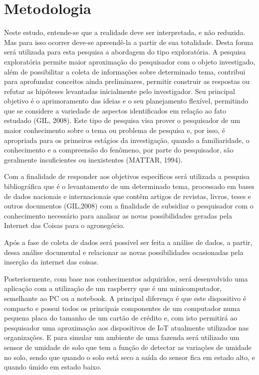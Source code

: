 \documentclass[eso]{bcc}
\begin{document}
\chapter{Metodologia}\label{chap:metodologia}
Neste estudo, entende-se que a realidade deve ser interpretada, e não reduzida. Mas para isso 
ocorrer deve-se apreendê-la a partir de sua totalidade. Desta forma será utilizada para esta 
pesquisa a abordagem do tipo exploratória. A pesquisa exploratória permite maior aproximação 
do pesquisador com o objeto investigado, além de possibilitar a coleta de informações sobre 
determinado tema, contribui para aprofundar conceitos ainda preliminares, permitir construir 
as respostas ou refutar as hipóteses levantadas inicialmente pelo investigador. Seu principal 
objetivo é o aprimoramento das ideias e o seu planejamento flexível, permitindo que se considere 
a variedade de aspectos identificados em relação ao fato estudado (GIL, 2008). 
Este tipo de pesquisa visa prover o pesquisador de um maior conhecimento sobre o tema ou 
problema de pesquisa e, por isso, é apropriada para os primeiros estágios da investigação, 
quando a familiaridade, o conhecimento e a compreensão do fenômeno, por parte do pesquisador, 
são geralmente insuficientes ou inexistentes (MATTAR, 1994).

Com a finalidade de responder aos objetivos específicos será utilizada a pesquisa bibliográfica 
que é o levantamento de um determinado tema, processado em bases de dados nacionais e internacionais 
que contêm artigos de revistas, livros, teses e outros documentos (GIL,2008) com a finalidade de 
subsidiar o pesquisador com o conhecimento necessário para analisar as novas possibilidades geradas 
pela Internet das Coisas para o agronegócio.

Após a fase de coleta de dados será possível ser feita a análise de dados, a partir, dessa análise 
documental e relacionar as novas possibilidades ocasionadas pela inserção da internet das coisas.

Posteriormente, com base nos conhecimentos adquiridos, será desenvolvido uma aplicação com a 
utilização de um raspberry que é um minicomputador, semelhante ao PC ou a notebook. A principal 
diferença é que este dispositivo é compacto e possui todos os principais componentes de um 
computador numa pequena placa do tamanho de um cartão de crédito e, com isto permitirá ao 
pesquisador uma aproximação aos dispositivos de IoT atualmente utilizados nas organizações. 
E para simular um ambiente de uma fazenda será utilizado um sensor de umidade de solo que tem 
a função de detectar as variações de umidade no solo, sendo que quando o solo está seco a saída 
do sensor fica em estado alto, e quando úmido em estado baixo.
\end{document}
